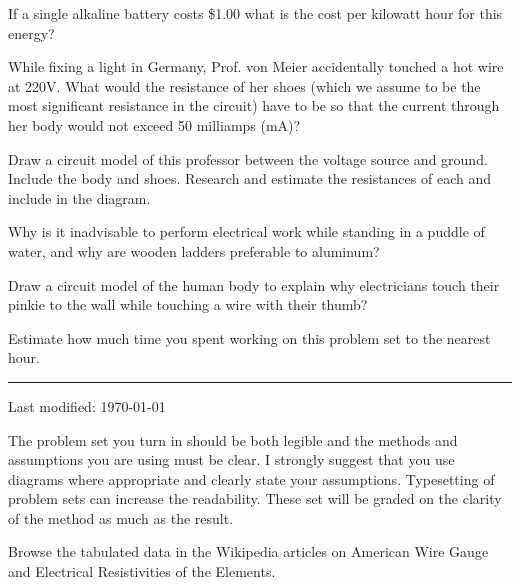 \documentclass{article}
\begin{document}
\subproblem
If a single alkaline battery costs \$1.00 what is the cost per kilowatt
hour for this energy?



\subproblem
While fixing a light in Germany, Prof. von Meier accidentally
touched a hot wire at 220V.  What would the resistance of her shoes
(which we assume to be the most significant resistance in the
circuit) have to be so that the current through her body would not
exceed 50 milliamps (mA)?

\subproblem
Draw a circuit model of this professor between the voltage source and
ground.  Include the body and shoes.  Research and estimate the
resistances of each and include in the diagram.

\subproblem
Why is it inadvisable to perform electrical work while standing
in a puddle of water, and why are wooden ladders preferable to
aluminum?

\subproblem
Draw a circuit model of the human body to explain why electricians touch
their pinkie to the wall while touching a wire with their thumb?



Estimate how much time you spent working on this problem set to the
nearest hour.

\newpage
\setcounter{problem}{0}
\setcounter{page}{1}
\hrule
\vspace{10pt}

{\tiny Last modified: \today}

The problem set you turn in should be both legible and the methods and
assumptions you are using must be clear.  I strongly suggest that
you use diagrams where appropriate and clearly state your assumptions.
Typesetting of problem sets can increase the readability.  These set
will be graded on the clarity of the method as much as the result.



Browse the tabulated data in the Wikipedia articles on American Wire Gauge and
Electrical Resistivities of the Elements.


\end{document}
